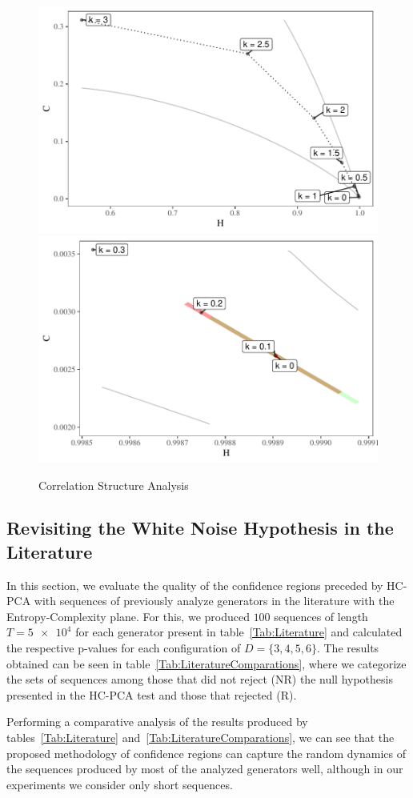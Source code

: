 \begin{figure}
    \centering
	\includegraphics[width=.48\linewidth]{Figures/Correlation-Analysis-dotted.pdf}
    \includegraphics[width=.48\linewidth]{Figures/Correlation-Analysis-point.pdf}
    \caption{Correlation Structure Analysis}
    \label{fig:correlation}
\end{figure}

\subsection{Revisiting the White Noise Hypothesis in the Literature}

In this section, we evaluate the quality of the confidence regions preceded by HC-PCA with sequences of previously analyze generators in the literature with the Entropy-Complexity plane.
For this, we produced $100$ sequences of length $T = \num[scientific-notation=true]{5 e4}$ for each generator present in table~\ref{Tab:Literature} and calculated the respective p-values for each configuration of $D = \{3, 4, 5, 6\}$.
The results obtained can be seen in table~\ref{Tab:LiteratureComparations}, where we categorize the sets of sequences among those that did not reject (NR) the null hypothesis presented in the HC-PCA test and those that rejected (R).

Performing a comparative analysis of the results produced by tables~\ref{Tab:Literature} and~\ref{Tab:LiteratureComparations}, we can see that the proposed methodology of confidence regions can capture the random dynamics of the sequences produced by most of the analyzed generators well, although in our experiments we consider only short sequences.

